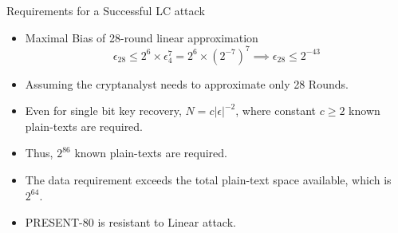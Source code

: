 \begin{frame}{Requirements for a Successful LC attack}
\begin{itemize}
    \item Maximal Bias of 28-round linear approximation 
    \begin{equation*}
        \epsilon_{28} \leq 2^{6} \times \epsilon_4^{7} = 2^6 \times (2^{-7})^7 \implies \epsilon_{28} \leq 2^{-43}
    \end{equation*}
    \item Assuming the cryptanalyst needs to approximate only 28 Rounds.
    \item Even for single bit key recovery, $N = c|\epsilon|^{-2}$, where constant $c \geq 2$ known plain-texts are required.
    \item Thus, $2^{86}$ known plain-texts are required. 
    \item The data requirement exceeds the total plain-text space available, which is $2^{64}$. 
    \item PRESENT-80 is resistant to Linear attack.
\end{itemize}
    
\end{frame}